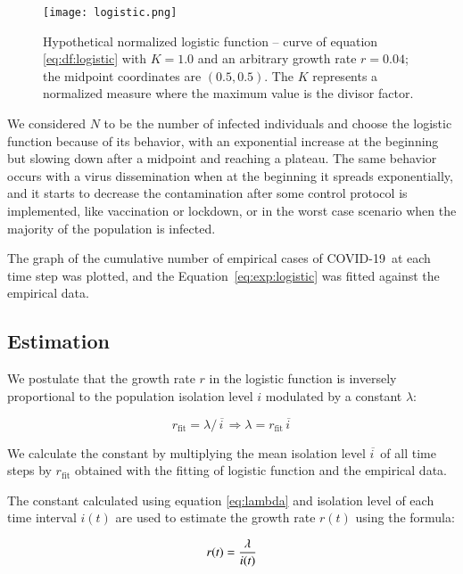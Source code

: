 \documentclass[review]{elsarticle}
\def\covid{\hbox{COVID-19}} %
\begin{document}
\begin{figure}
\centering
\texttt{[image: logistic.png]}
\caption{Hypothetical normalized logistic function -- 
curve of equation \ref{eq:df:logistic} with 
$K=1.0$ and an arbitrary growth rate $r=0.04$; 
the midpoint coordinates are $(0.5, 0.5)$.
The $K$ represents a normalized measure where 
the maximum value is the divisor factor.}
\label{fig:logistic}
\end{figure}

We considered $N$ to be the number of infected individuals 
and choose the logistic function because of its behavior, 
with an exponential increase at the beginning but slowing down after 
a  midpoint and reaching a plateau. 
The same behavior occurs with a virus dissemination when at the 
beginning it spreads exponentially, and it starts to 
decrease the contamination after some control protocol is implemented, 
like vaccination or lockdown, 
or in the worst case scenario when the majority of the population is infected.

The graph of the cumulative number of empirical cases of \covid\ 
at each time step was plotted, 
and the Equation~\ref{eq:exp:logistic} was fitted against the 
empirical data.

\subsection{Estimation}

We postulate that the growth rate $r$ in the logistic function is 
inversely proportional to the population isolation level $i$ 
modulated by a constant $\lambda$:

\begin{equation}
r_{\text{fit}} = {\lambda /\, \overline{i\,}} \Rightarrow \lambda = r_{\text{fit}}\, \overline{i\,}
\label{eq:lambda}
\end{equation}

We calculate the constant by multiplying 
the mean isolation level $\overline{i\,}$  
of all time steps by 
$r_{\text{fit}}$ obtained with the fitting of 
logistic function and the empirical data.

The constant calculated using equation \ref{eq:lambda} 
and isolation level of each time interval $i(t)$ 
are used to estimate the growth rate $r(t)$ using the formula:

\begin{equation}
r(t) = {\lambda\over i(t)}
\label{eq:rt}
\end{equation}
\end{document}
